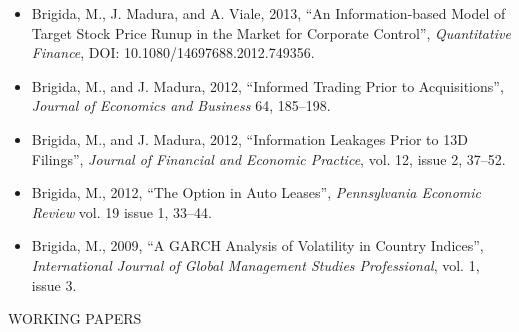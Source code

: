 \documentclass[9pt]{article}
\begin{document}
\begin{itemize}[noitemsep, nolistsep]
\item Brigida, M., J. Madura, and A. Viale, 2013, ``An Information-based Model of Target Stock Price Runup in the Market for Corporate Control'', {\it Quantitative Finance\/}, DOI: 10.1080/14697688.2012.749356.
\item Brigida, M., and J. Madura, 2012, ``Informed Trading Prior to Acquisitions'', {\it Journal of Economics and Business} 64, 185--198.
\item Brigida, M., and J. Madura, 2012, ``Information Leakages Prior to 13D Filings'', {\it Journal of Financial and Economic Practice}, vol. 12, issue 2, 37--52.
\item Brigida, M., 2012, ``The Option in Auto Leases'', {\it Pennsylvania Economic Review} vol. 19 issue 1, 33--44.
\item Brigida, M., 2009, ``A GARCH Analysis of Volatility in Country Indices'', {\it International Journal of Global Management Studies Professional}, vol. 1, issue 3.
\end{itemize}
\vspace{10pt}
WORKING PAPERS
\end{document}
